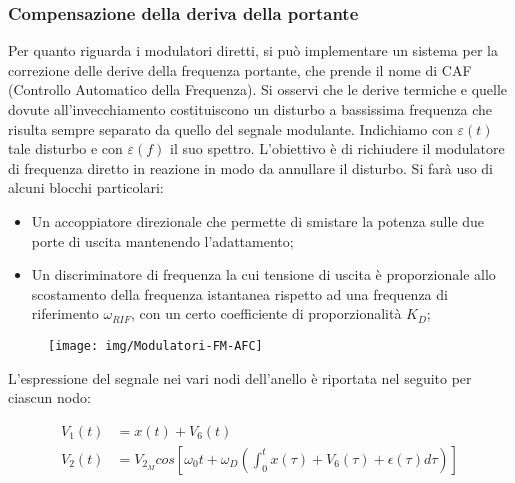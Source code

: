 \subsubsection{Compensazione della deriva della portante}
Per quanto riguarda i modulatori diretti, si può implementare un sistema per la correzione delle derive della frequenza portante, che prende il nome di CAF (Controllo Automatico della Frequenza).
Si osservi che le derive termiche e quelle dovute all'invecchiamento costituiscono un disturbo a bassissima frequenza che risulta sempre separato da quello del segnale modulante. Indichiamo con $\varepsilon(t)$ tale disturbo e con $\varepsilon(f)$ il suo spettro.
L'obiettivo è di richiudere il modulatore di frequenza diretto in reazione in modo da annullare il disturbo. Si farà uso di alcuni blocchi particolari:
\begin{itemize}
\item Un accoppiatore direzionale che permette di smistare la potenza sulle due porte di uscita mantenendo l'adattamento;
\item Un discriminatore di frequenza la cui tensione di uscita è proporzionale allo scostamento della frequenza istantanea rispetto ad una frequenza di riferimento $\omega_{RIF}$, con un certo coefficiente di proporzionalità $K_D$;
\end{itemize}

\begin{figure}[hbt]
\centering
\texttt{[image: img/Modulatori-FM-AFC]}
\caption{}
\label{fig:caf}
\end{figure}

L'espressione del segnale nei vari nodi dell'anello è riportata nel seguito per ciascun nodo:

\begin{align*}
V_1(t) &= x(t) + V_6(t)\\
V_2(t) &= V_{2_M} cos\left[ \omega_0t + \omega_D\left( \int_{0}^{t} x(\tau) + V_6(\tau) + \epsilon(\tau) d\tau\right)\right]
\end{align*}

